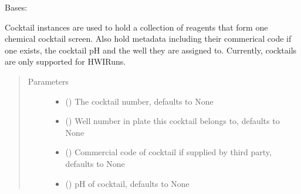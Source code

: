 \documentclass[letterpaper,10pt,english]{sphinxmanual}
\begin{document}
\begin{fulllineitems}
\label{\detokenize{polo.crystallography:polo.crystallography.cocktail.Cocktail}}
Bases: 

Cocktail instances are used to hold a collection of reagents
that form one chemical cocktail screen. Also hold metadata including
their commerical code if one exists, the cocktail pH and the
well they are assigned to. Currently, cocktails are only supported
for HWIRuns.
\begin{quote}\begin{description}
\item[{Parameters}] \leavevmode\begin{itemize}
\item {} 
 (\sphinxstyleliteralemphasis{\sphinxupquote{, }}) \textendash{} The cocktail number, defaults to None

\item {} 
 (\sphinxstyleliteralemphasis{\sphinxupquote{, }}) \textendash{} Well number in plate this cocktail belongs to,         defaults to None

\item {} 
 (\sphinxstyleliteralemphasis{\sphinxupquote{, }}) \textendash{} Commercial code of cocktail if supplied by         third party, defaults to None

\item {} 
 (\sphinxstyleliteralemphasis{\sphinxupquote{, }}) \textendash{} pH of cocktail, defaults to None


\end{itemize}
\end{description}
\end{quote}
\end{fulllineitems}
\end{document}
